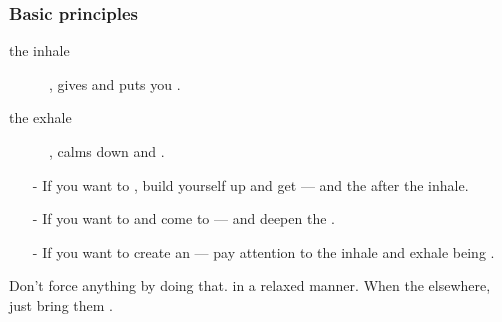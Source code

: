 \begin{frame}
\frametitle{Basic principles}

\begin{description}
\item[the inhale] , gives  and puts you .
\item[the exhale] , calms down and .
  \end{description}

\begin{itemize}
\item[-] If you want to , build yourself up and get  ---  and the  after the inhale.
\item[-] If you want to  and come to  ---  and deepen the .
  \item[-] If you want to create an  --- pay attention to the inhale and exhale being .
\end{itemize}

Don't force anything by doing that.  in a relaxed manner. When the  elsewhere, just bring them .
\end{frame}

